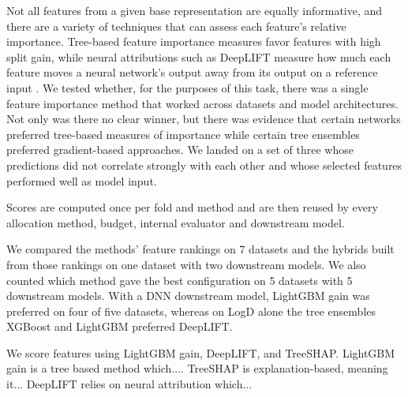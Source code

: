 Not all features from a given base representation are equally informative, and there are a variety of techniques that can assess each feature's relative importance. Tree-based feature importance measures favor features with high split gain, while neural attributions such as DeepLIFT measure how much each feature moves a neural network's output away from its output on a reference input \citep{Strobl2007, Ancona2018}.
We tested whether, for the purposes of this task, there was a single feature importance method that worked across datasets and model architectures. Not only was there no clear winner, but there was evidence that certain networks preferred tree-based measures of importance while certain tree ensembles preferred gradient-based approaches. We landed on a set of three whose predictions did not correlate strongly with each other and whose selected features performed well as model input.

Scores are computed once per fold and method and are then reused by every allocation method, budget, internal evaluator and downstream model.

We compared the methods' feature rankings on 7 datasets and the hybrids built from those rankings on one dataset with two downstream models. We also counted which method gave the best configuration on 5 datasets with 5 downstream models.
With a DNN downstream model, LightGBM gain was preferred on four of five datasets, whereas on LogD alone the tree ensembles XGBoost and LightGBM preferred DeepLIFT.

We score features using LightGBM gain, DeepLIFT, and TreeSHAP. LightGBM gain is a tree based method which.... TreeSHAP is explanation-based, meaning it... DeepLIFT relies on neural attribution which...

